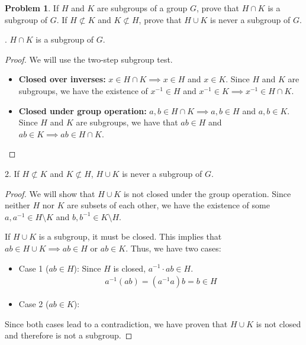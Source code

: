 \documentclass[12pt,reqno]{article}
\theoremstyle{plain}
\theoremstyle{definition}
\newtheorem{problem}{Problem}
\begin{document}
\begin{problem}
    If $H$ and $K$ are subgroups of a group $G$, prove that $H \cap K$ is a subgroup of $G$. If $H \not \subset K$ and $K \not \subset H$, prove that $H \cup K$ is never a subgroup of $G$.
\end{problem}

. \(H\cap K\) is a subgroup of \(G\).

\begin{proof}
    We will use the two-step subgroup test.
    \begin{itemize}
        \item \textbf{Closed over inverses:} \(x\in H\cap K \implies x\in H\) and
        \(x\in K\). Since \(H\) and \(K\) are subgroups, we have the existence of \(x^{-1}\in H\) and 
        \(x^{-1}\in K \implies x^{-1}\in H\cap K\). 

        \item \textbf{Closed under group operation:} \(a,b\in H\cap K\implies a,b\in H\) and \(a,b\in K\).
        Since \(H\) and \(K\) are subgroups, we have that \(ab\in H\) and \(ab\in K\implies ab\in H\cap K\).
    \end{itemize}
\end{proof}

2. If $H \not \subset K$ and $K \not \subset H$, $H \cup K$ is never a subgroup of $G$.
\begin{proof}
    We will show that \(H\cup K\) is not closed under the group operation. 
    Since neither \(H\) nor \(K\) are subsets of each other, we have the existence of some 
    \(a,a^{-1}\in H\setminus K\) and \(b,b^{-1}\in K\setminus H\).

    If \(H\cup K\) is a subgroup, it must be closed. This implies that 
    \(ab\in H\cup K \implies ab\in H\) or \(ab\in K\). Thus, we have two cases:

    \begin{itemize}
        \item Case 1 (\(ab\in H\)): Since \(H\) is closed, \(a^{-1}\cdot ab \in H\).
        \begin{align*}
            a^{-1}(ab)=(a^{-1}a)b=b\in H
        \end{align*}

        \item Case 2 (\(ab\in K\)): 
    \end{itemize}

    Since both cases lead to a contradiction, we have proven that \(H\cup K\) is not closed
    and therefore is not a subgroup.
\end{proof}
\end{document}

